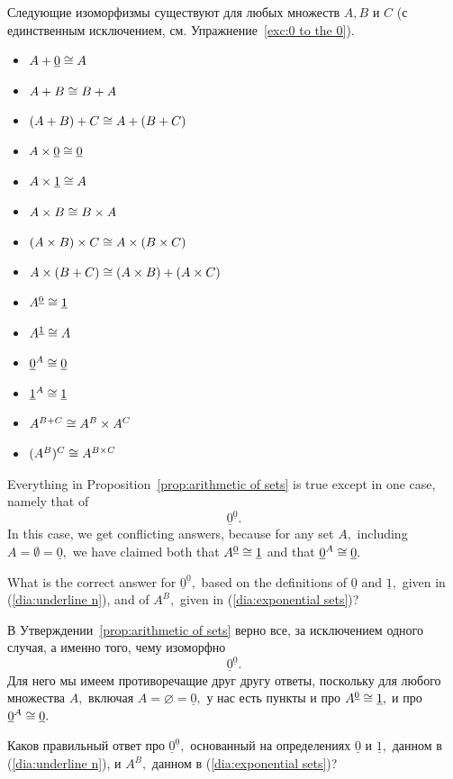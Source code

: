 \documentclass[../main/CT4S-EN-RU]{subfiles}
\begin{document}
\begin{propositionRUS}\label{prop:arithmetic of sets}
Следующие изоморфизмы существуют для любых множеств $A,B$ и $C$ (с единственным исключением, см. Упражнение~\ref{exc:0 to the 0}). 
 
\begin{itemize}
\item $A+\underline{0}\cong A$
\item $A + B\cong B + A$
\item $(A + B) + C \cong A + (B + C)$
\item $A\times\underline{0}\cong\underline{0}$
\item $A\times\underline{1}\cong A$
\item $A\times B\cong B\times A$
\item $(A\times B)\times C \cong A\times (B\times C)$
\item $A\times(B+C)\cong (A\times B)+(A\times C)$
\item $A^{\underline{0}}\cong \underline{1}$
\item $A^{\underline{1}}\cong A$
\item $\underline{0}^A\cong\underline{0}$
\item $\underline{1}^A\cong\underline{1}$
\item $A^{B+C}\cong A^B\times A^C$
\item $(A^B)^C\cong A^{B\times C}$
\end{itemize}
\end{propositionRUS}

\begin{exerciseENG}\label{exc:0 to the 0}
Everything in Proposition~\ref{prop:arithmetic of sets} is true except in one case, namely that of $$\underline{0}^{\underline{0}}.$$ In this case, we get conflicting answers, because for any set $A,$ including $A=\emptyset=\underline{0},$ we have claimed both that $A^{\underline{0}}\cong\underline{1}$ and that $\underline{0}^A\cong\underline{0}.$ 

What is the correct answer for $\underline{0}^{\underline{0}},$ based on the definitions of $\underline{0}$ and $\underline{1},$ given in (\ref{dia:underline n}), and of $A^B,$ given in (\ref{dia:exponential sets})?
\end{exerciseENG}

\begin{exerciseRUS}\label{exc:0 to the 0}
В Утверждении~\ref{prop:arithmetic of sets} верно все, за исключением одного случая, а именно того, чему изоморфно $$\underline{0}^{\underline{0}}.$$ Для него мы имеем противоречащие друг другу ответы, поскольку для любого множества $A,$ включая $A=\varnothing=\underline{0},$ у нас есть пункты и про $A^{\underline{0}}\cong\underline{1},$ и про $\underline{0}^A\cong\underline{0}.$ 

Каков правильный ответ про $\underline{0}^{\underline{0}},$ основанный на определениях $\underline{0}$ и $\underline{1},$ данном в (\ref{dia:underline n}), и $A^B,$ данном в (\ref{dia:exponential sets})?
\end{exerciseRUS}
\end{document}
